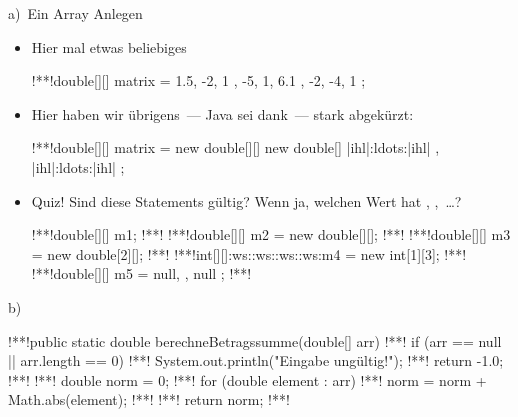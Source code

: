 \begin{frame}[fragile]{a)~Ein Array Anlegen}
\SetupLstHl
\begin{itemize}[<+(1)->]
    \itemsep8pt
    \item Hier mal etwas beliebiges
\begin{plainjava}[aboveskip=0pt]
!**!double[][] matrix = { { 1.5, -2, 1 }, { -5, 1, 6.1 }, { -2, -4, 1 } };
\end{plainjava}
    \item<4-> Hier haben wir übrigens~--- Java sei dank~--- stark abgekürzt:
\begin{plainjava}[aboveskip=0pt]
!**!double[][] matrix = new double[][] { new double[] { |ihl|:ldots:|ihl| }, |ihl|:ldots:|ihl| };
\end{plainjava}
    \item<6-> Quiz! Sind diese Statements gültig? Wenn ja, welchen Wert hat , ,~\ldots? 
\begin{plainjava}[aboveskip=0pt,lineskip=3pt]
!**!double[][] m1; !**!
!**!double[][] m2 = new double[][]; !**!
!**!double[][] m3 = new double[2][]; !**!
!**!int[][]:ws::ws::ws::ws:m4 = new int[1][3]; !**!
!**!double[][] m5 = { null, {}, { null } }; !**!
\end{plainjava}
\end{itemize}
\end{frame}

\begin{frame}[fragile,c]{b)~}
\begin{plainjava}[lineskip=2pt]
!**!public static double berechneBetragssumme(double[] arr) {
!**!    if (arr == null || arr.length == 0) {
!**!        System.out.println("Eingabe ungültig!");
!**!        return -1.0;
!**!    }
!**!    double norm = 0;
!**!    for (double element : arr) {
!**!        norm = norm + Math.abs(element);
!**!    }
!**!    return norm;
!**!}
\end{plainjava}
\end{frame}

